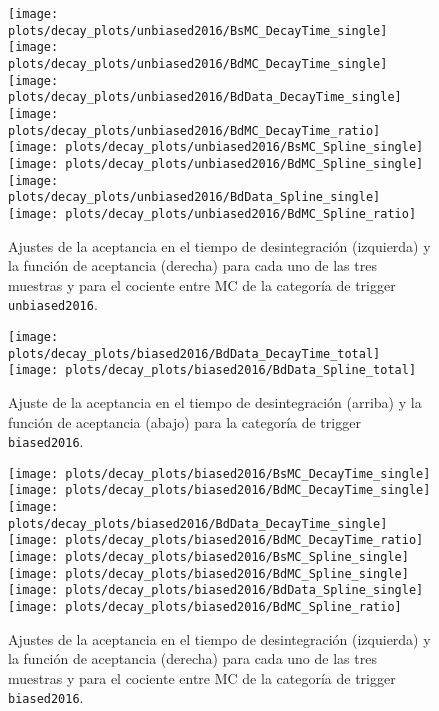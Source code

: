 \begin{figure}[H]
\centering
\begin{multicols}{2}
\texttt{[image: plots/decay\_plots/unbiased2016/BsMC\_DecayTime\_single]}
\texttt{[image: plots/decay\_plots/unbiased2016/BdMC\_DecayTime\_single]}
\texttt{[image: plots/decay\_plots/unbiased2016/BdData\_DecayTime\_single]}
\texttt{[image: plots/decay\_plots/unbiased2016/BdMC\_DecayTime\_ratio]}
\texttt{[image: plots/decay\_plots/unbiased2016/BsMC\_Spline\_single]}
\texttt{[image: plots/decay\_plots/unbiased2016/BdMC\_Spline\_single]}
\texttt{[image: plots/decay\_plots/unbiased2016/BdData\_Spline\_single]}
\texttt{[image: plots/decay\_plots/unbiased2016/BdMC\_Spline\_ratio]}
\end{multicols}
\caption{Ajustes de la aceptancia en el tiempo de desintegración (izquierda) y la función de aceptancia (derecha) para cada uno de las tres muestras y para el cociente entre MC de la categoría de trigger \texttt{unbiased2016}.}  \label{fig:acctimeother}
\end{figure}


\begin{figure}[H]
\centering
\texttt{[image: plots/decay\_plots/biased2016/BdData\_DecayTime\_total]}
\texttt{[image: plots/decay\_plots/biased2016/BdData\_Spline\_total]}
\caption{Ajuste de la aceptancia en el tiempo de desintegración (arriba) y la función de aceptancia (abajo) para la categoría de trigger \texttt{biased2016}.}  \label{fig:acctimebsdata}
\end{figure}


\begin{figure}[H]
\centering
\begin{multicols}{2}
\texttt{[image: plots/decay\_plots/biased2016/BsMC\_DecayTime\_single]}
\texttt{[image: plots/decay\_plots/biased2016/BdMC\_DecayTime\_single]}
\texttt{[image: plots/decay\_plots/biased2016/BdData\_DecayTime\_single]}
\texttt{[image: plots/decay\_plots/biased2016/BdMC\_DecayTime\_ratio]}
\texttt{[image: plots/decay\_plots/biased2016/BsMC\_Spline\_single]}
\texttt{[image: plots/decay\_plots/biased2016/BdMC\_Spline\_single]}
\texttt{[image: plots/decay\_plots/biased2016/BdData\_Spline\_single]}
\texttt{[image: plots/decay\_plots/biased2016/BdMC\_Spline\_ratio]}
\end{multicols}
\caption{Ajustes de la aceptancia en el tiempo de desintegración (izquierda) y la función de aceptancia (derecha) para cada uno de las tres muestras y para el cociente entre MC de la categoría de trigger \texttt{biased2016}.}  \label{fig:acctimeother}
\end{figure}




